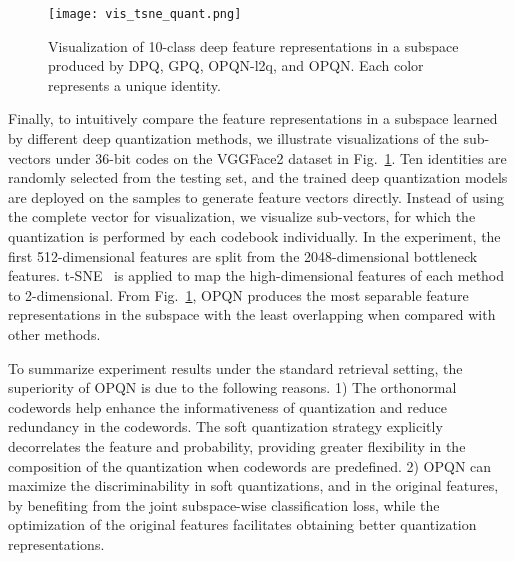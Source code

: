 \documentclass{elsarticle}
\begin{document}
\begin{figure}[!hbp]
	\centering
	\texttt{[image: vis\_tsne\_quant.png]}
	\caption{Visualization of 10-class deep feature representations in a subspace produced by DPQ, GPQ, OPQN-l2q, and OPQN. Each color represents a unique identity.}
	\label{vis_tsne}
\end{figure}

Finally, to intuitively compare the feature representations in a subspace learned by different deep quantization methods, we illustrate visualizations of the sub-vectors under 36-bit codes on the VGGFace2 dataset in Fig.~\ref{vis_tsne}. Ten identities are randomly selected from the testing set, and the trained deep quantization models are deployed on the samples to generate feature vectors directly. Instead of using the complete vector for visualization, we visualize sub-vectors, for which the quantization is performed by each codebook individually. In the experiment, the first 512-dimensional features are split from the 2048-dimensional bottleneck features. t-SNE~\cite{maaten2008visualizing} is applied to map the high-dimensional features of each method to 2-dimensional. From Fig.~\ref{vis_tsne}, OPQN produces the most separable feature representations in the subspace with the least overlapping when compared with other methods. 

To summarize experiment results under the standard retrieval setting, the superiority of OPQN is due to the following reasons. 1) The orthonormal codewords help enhance the informativeness of quantization and reduce redundancy in the codewords. The soft quantization strategy explicitly decorrelates the feature and probability, providing greater flexibility in the composition of the quantization when codewords are predefined. 2) OPQN can maximize the discriminability in soft quantizations, and in the original features, by benefiting from the joint subspace-wise classification loss, while the optimization of the original features facilitates obtaining better quantization representations. 
\end{document}
